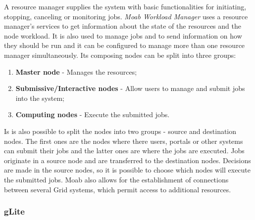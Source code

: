 A resource manager supplies the system with basic functionalities for initiating, stopping, canceling or monitoring jobs. \textit{Moab Workload Manager} uses a resource manager's services to get information about the state of the resources and the node workload. It is also used to manage jobs and to send information on how they should be run and it can be configured to manage more than one resource manager simultaneously.
Its composing nodes can be split into three groups:
\begin{enumerate}
\item \textbf{Master node} - Manages the resources;
\item \textbf{Submissive/Interactive nodes} - Allow users to manage and submit jobs into the system;
\item \textbf{Computing nodes} - Execute the submitted jobs.
\end{enumerate}

Is is also possible to split the nodes into two groups - source and destination nodes. The first ones are the nodes where there users, portals or other systems can submit their jobs and the latter ones are where the jobs are executed. Jobs originate in a source node and are transferred to the destination nodes. Decisions are made in the source nodes, so it is possible to choose which nodes will execute the submitted jobs.
Moab also allows for the establishment of connections between several Grid systems, which permit access to additional resources.\cite{jorge-ruao, moab}


\subsubsection{gLite}\label{glite}


